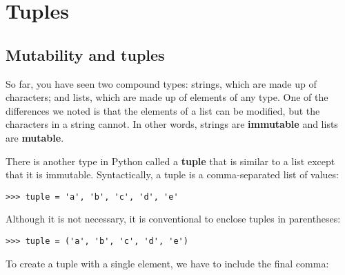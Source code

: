 




\chapter{Tuples}
\label{tuplechap}

\section{Mutability and tuples}

So far, you have seen two compound types: strings, which are made up
of characters; and lists, which are made up of elements of any type.
One of the differences we noted is that the elements of a list can be
modified, but the characters in a string cannot.  In other words, strings
are {\bf immutable} and lists are {\bf mutable}.


There is another type in Python called a {\bf tuple} that is similar
to a list except that it is immutable.  Syntactically, a tuple is a
comma-separated list of values:

\beforeverb
\begin{verbatim}
>>> tuple = 'a', 'b', 'c', 'd', 'e'
\end{verbatim}
\afterverb
%
Although it is not necessary, it is conventional to enclose tuples in
parentheses:

\beforeverb
\begin{verbatim}
>>> tuple = ('a', 'b', 'c', 'd', 'e')
\end{verbatim}
\afterverb
%
To create a tuple with a single element, we have to include the final
comma:

